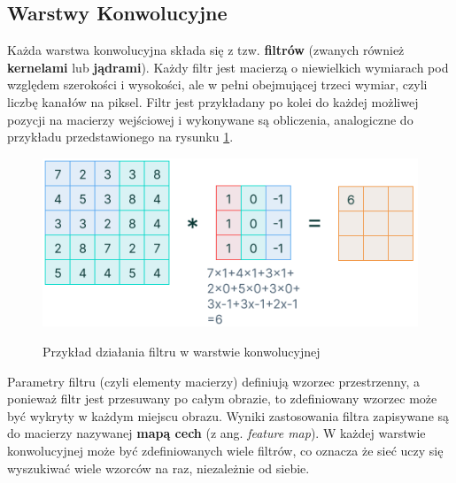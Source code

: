 \subsection{Warstwy Konwolucyjne}
Każda warstwa konwolucyjna składa się z tzw. \textbf{filtrów} (zwanych również \textbf{kernelami} lub \textbf{jądrami}). Każdy filtr jest macierzą o niewielkich wymiarach pod względem szerokości i wysokości, ale w pełni obejmującej trzeci wymiar, czyli liczbę kanałów na piksel. Filtr jest przykładany po kolei do każdej możliwej pozycji na macierzy wejściowej i wykonywane są obliczenia, analogiczne do przykładu przedstawionego na rysunku \ref{ConvLayers}. \\

\begin{figure}[h]
\begin{center}
\includegraphics[width=15cm]{resources/figures/conv-layer.png}
\caption{Przykład działania filtru w warstwie konwolucyjnej}
\label{ConvLayers}
\end{center}
\end{figure}

\vspace{-0.5cm}
Parametry filtru (czyli elementy macierzy) definiują wzorzec przestrzenny, a ponieważ filtr jest przesuwany po całym obrazie, to zdefiniowany wzorzec może być wykryty w każdym miejscu obrazu. Wyniki zastosowania filtra zapisywane są do macierzy nazywanej \textbf{mapą cech} (z ang. \textit{feature map}). W każdej warstwie konwolucyjnej może być zdefiniowanych wiele filtrów, co oznacza że sieć uczy się wyszukiwać wiele wzorców na raz, niezależnie od siebie.

